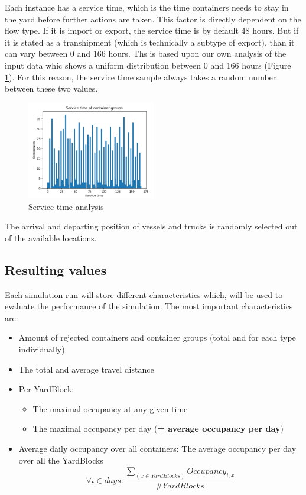 \documentclass[]{article}
\begin{document}
Each instance has a service time, which is the time containers needs to stay in
the yard before further actions are taken. This factor is directly dependent on
the flow type. If it is import or export, the service time is by default 48
hours. But if it is stated as a transhipment (which is technically a subtype of
export), than it can vary between 0 and 166 hours. Ths is based upon our own
analysis of the input data whic shows a uniform distribution between 0 and 166
hours (Figure \ref{fig: service time analysis}). For this reason, the service
time sample always takes a random number between these two values.
\begin{figure}
	\centering
	\includegraphics[width=0.5\textwidth]{Afbeeldingen/service time analysis.png}
	\caption{Service time analysis}
	\label{fig: service time analysis}
\end{figure}

The arrival and departing position of vessels and trucks is randomly selected
out of the available locations.

\subsection{Resulting values}
Each simulation run will store different characteristics which, will be used to
evaluate the performance of the simulation. The most important characteristics
are: \begin{itemize}
	\item Amount of rejected containers and container groups (total and for each type
	      individually)
	\item The total and average travel distance
	\item Per YardBlock:
	      \begin{itemize}
		      \item The maximal occupancy at any given time
		      \item The maximal occupancy per day (\textbf{= average occupancy per day})
	      \end{itemize}
	\item Average daily occupancy over all containers: The average occupancy per day over
	      all the YardBlocks \[\forall i \in days: \frac{\sum_{(x \in YardBlocks)}
			      \overline{Occupancy_{i,x}}}{\#YardBlocks}\]
\end{itemize}
\end{document}
